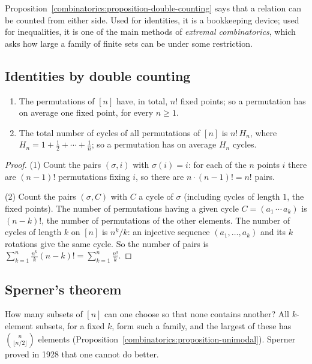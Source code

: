 Proposition~\ref{combinatorics:proposition-double-counting} says that a relation can be counted from either side. Used for identities, it is a bookkeeping device; used for inequalities, it is one of the
main methods of \emph{extremal combinatorics}, which asks how large a family of finite sets can be under some restriction.

\subsection{Identities by double counting}\label{combinatorics:subsection-identities-double-counting}

\begin{proposition}\label{combinatorics:proposition-fixed-points-average}
\begin{enumerate}
\item The permutations of $[n]$ have, in total, $n!$ fixed points; so a permutation has on average one fixed point, for every $n \geq 1$.
\item The total number of cycles of all permutations of $[n]$ is $n!\,H_n$, where $H_n = 1 + \frac12 + \cdots + \frac1n$; so a permutation has on average $H_n$ cycles.
\end{enumerate}
\end{proposition}

\begin{proof}
(1) Count the pairs $(\sigma, i)$ with $\sigma(i) = i$: for each of the $n$ points $i$ there are $(n - 1)!$ permutations fixing $i$, so there are $n \cdot (n - 1)! = n!$ pairs.

(2) Count the pairs $(\sigma, C)$ with $C$ a cycle of $\sigma$ (including cycles of length $1$, the fixed points). The number of permutations having a given cycle $C = (a_1 \, \cdots \, a_k)$ is $(n - k)!$,
the number of permutations of the other elements. The number of cycles of length $k$ on $[n]$ is $n^{\underline{k}}/k$: an injective sequence $(a_1, \ldots, a_k)$ and its $k$ rotations give the same
cycle. So the number of pairs is $\sum_{k=1}^{n}\frac{n^{\underline{k}}}{k}(n - k)! = \sum_{k=1}^{n}\frac{n!}{k}$.
\end{proof}

\subsection{Sperner's theorem}\label{combinatorics:subsection-sperner}

How many subsets of $[n]$ can one choose so that none contains another? All $k$-element subsets, for a fixed $k$, form such a family, and the largest of these has $\binom{n}{\lfloor n/2 \rfloor}$
elements (Proposition~\ref{combinatorics:proposition-unimodal}). Sperner proved in 1928 that one cannot do better.

